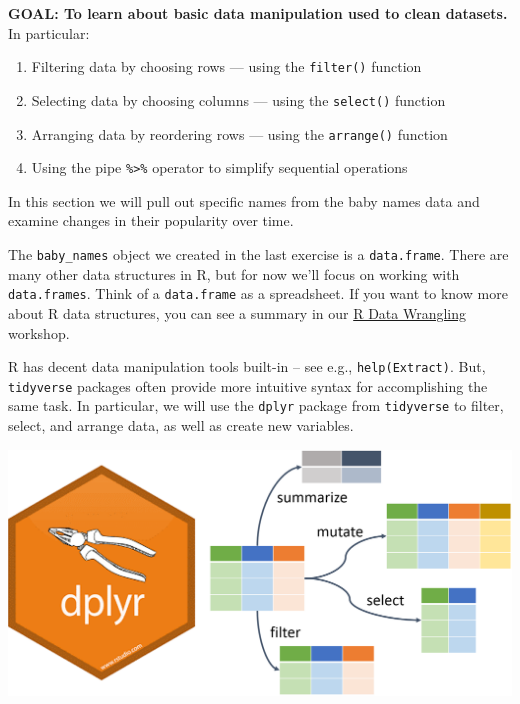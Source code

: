 \documentclass[
]{book}
\providecommand{\tightlist}{%
  \setlength{\itemsep}{0pt}\setlength{\parskip}{0pt}}
\begin{document}
\begin{alert}

\textbf{GOAL: To learn about basic data manipulation used to clean datasets.} In particular:

\begin{enumerate}
\def\labelenumi{\arabic{enumi}.}
\tightlist
\item
  Filtering data by choosing rows --- using the \texttt{filter()} function
\item
  Selecting data by choosing columns --- using the \texttt{select()} function
\item
  Arranging data by reordering rows --- using the \texttt{arrange()} function
\item
  Using the pipe \texttt{\%\textgreater{}\%} operator to simplify sequential operations
\end{enumerate}

\end{alert}

In this section we will pull out specific names from the baby names data and
examine changes in their popularity over time.

The \texttt{baby\_names} object we created in the last exercise is a \texttt{data.frame}.
There are many other data structures in R, but for now we'll focus on
working with \texttt{data.frames}. Think of a \texttt{data.frame} as a spreadsheet.
If you want to know more about R data structures, you can see a summary
in our \href{./RDataWrangling.html\#data-types-and-structures}{R Data Wrangling} workshop.

R has decent data manipulation tools built-in -- see e.g.,
\texttt{help(Extract)}. But, \texttt{tidyverse} packages often provide
more intuitive syntax for accomplishing the same task. In
particular, we will use the \texttt{dplyr} package from \texttt{tidyverse}
to filter, select, and arrange data, as well as create new variables.

\includegraphics{R/Rintro/images/dplyr.png}
\end{document}
